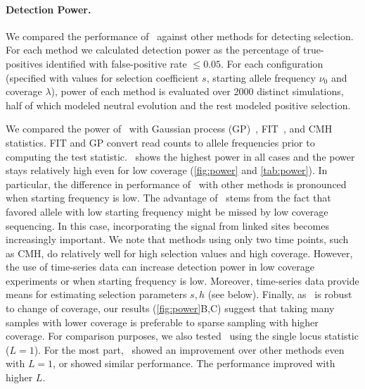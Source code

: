 \documentclass[9pt,twocolumn,twoside]{gsajnl}
\begin{document}
\paragraph{Detection Power.} 
We compared the performance of \comale\ against other methods for
detecting selection. For each method we calculated detection power as
the percentage of true-positives identified with false-positive rate
$\le 0.05$. For each configuration (specified with values for
selection coefficient $s$, starting allele frequency $\nu_0$ and
coverage $\lambda$), power of each method is evaluated over $2000$
distinct simulations, half of which modeled neutral evolution and the
rest modeled positive selection.



We compared the power of \comale\ with Gaussian process
(GP)~\cite{Terhorst2015Multi}, FIT~\cite{feder2014Identifying}, and
CMH~\cite{agresti2011categorical} statistics.  FIT and GP convert read
counts to allele frequencies prior to computing the test statistic.
\comale\ shows the highest power in all cases and the power stays
relatively high even for low coverage (\ref{fig:power} and
\ref{tab:power}). In particular, the difference in performance of
\comale\ with other methods is pronounced when starting frequency is
low.  The advantage of \comale\ stems from the fact that favored
allele with low starting frequency might be missed by low coverage
sequencing. In this case, incorporating the signal from linked sites
becomes increasingly important. We note that methods using only two
time points, such as CMH, do relatively well for high selection values
and high coverage. However, the use of time-series data can increase
detection power in low coverage experiments or when starting frequency
is low. Moreover, time-series data provide means for estimating
selection parameters $s,h$ (see below). Finally, as \comale\ is robust
to change of coverage, our results (\ref{fig:power}B,C) suggest that
taking many samples with lower coverage is preferable to sparse
sampling with higher coverage. For comparison purposes, we also tested
\comale\ using the single locus statistic ($L=1$). For the most part,
\comale\ showed an improvement over other methods even with $L=1$, or
showed similar performance. The performance improved with higher $L$.
\end{document}
